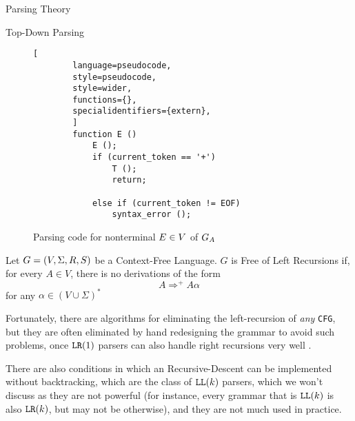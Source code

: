 \begin{section}{Parsing Theory}
\begin{subsection}{Top-Down Parsing}
\begin{figure}[ht]
	\centering
	\begin{lstlisting}[
		language=pseudocode,
		style=pseudocode,
		style=wider,
		functions={},
		specialidentifiers={extern},
		]
		function E ()
			E ();
			if (current_token == '+')
				T ();
				return;
			
			else if (current_token != EOF)
				syntax_error ();
	\end{lstlisting}
\caption{Parsing code for nonterminal $\protect E \in V$ of $\protect G_A$ }
\label{fig:recursive_descent_2}
\end{figure}

\begin{definition}
	Let $G = (V, \Sigma, R, S)$ be a Context-Free Language. $G$ is Free of
	Left Recursions if, for every $A \in V$, there is no derivations
	of the form
	$$ A \Rightarrow^+ A \alpha$$
	for any $\alpha \in (V \cup \Sigma)^*$
\end{definition}

Fortunately, there are algorithms for eliminating the left-recursion of
\textit{any} \texttt{CFG}, but they are often eliminated by hand redesigning
the grammar to avoid such problems, once $\texttt{LR}(1)$ parsers can also handle
right recursions very well \citep{dragonbook}.

There are also conditions in which an Recursive-Descent can be implemented
without backtracking, which are the class of $\texttt{LL}(k)$ parsers,
which we won't discuss as they are not powerful (for instance, every
grammar that is $\texttt{LL}(k)$ is also $\texttt{LR}(k)$, but may not be otherwise),
and they are not much used in practice.

\end{subsection}
\end{section}

